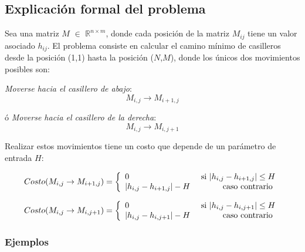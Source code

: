 \subsection{Explicación formal del problema}

Sea una matriz $M$ $\in$ $\mathbb{R}^{n \times m}$, donde cada posición de la matriz $M_{ij}$ tiene un valor asociado $h_{ij}$. El problema consiste en calcular el camino mínimo de casilleros desde la posición (1,1) hasta la posición ($N$,$M$), donde los únicos dos  movimientos posibles son:

\emph{Moverse hacia el casillero de abajo}: \[M_{i,j} \rightarrow M_{i+1,j}\] 

ó \emph{Moverse hacia el casillero de la derecha}: \[M_{i,j} \rightarrow M_{i,j+1}\]

Realizar estos movimientos tiene un costo que depende de un parámetro de entrada $H$:

\begin{equation} \label{costoHaciaAbajo}
   Costo(M_{i,j} \rightarrow M_{i+1,j}) = \left\{ 
     \begin{array}{lr}
       0 							& $ si $  |h_{i,j} - h_{i+1,j}| \leq H \\
       |h_{i,j} - h_{i+1,j}| - H 	&   $ caso contrario $ \\
     \end{array}
   \right.
\end{equation} 

\begin{equation}\label{costoHaciaDerecha}
  Costo(M_{i,j} \rightarrow M_{i,j+1}) = \left\{ 
     \begin{array}{lr}
       0 							& $ si $  |h_{i,j} - h_{i,j+1}| \leq H \\
       |h_{i,j} - h_{i,j+1}| - H 	&   $ caso contrario $ \\
     \end{array}
   \right.
\end{equation} 

\subsubsection{Ejemplos}

